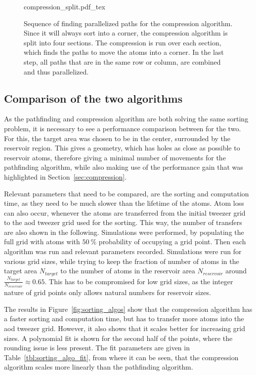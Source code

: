 \begin{figure}[ht]%
\centering
{compression_split.pdf_tex}
\caption{Sequence of finding parallelized paths for the compression algorithm. Since it will always sort into a corner, the compression algorithm is split into four sections. The compression is run over each section, which finds the paths to move the atoms into a corner. In the last step, all paths that are in the same row or column, are combined and thus parallelized.}%
\label{fig:compression_split}
\end{figure}

\subsection{Comparison of the two algorithms}

As the pathfinding and compression algorithm are both solving the same sorting problem, it is necessary to see a performance comparison between for the two. For this, the target area was chosen to be in the center, surrounded by the reservoir region. This gives a geometry, which has holes as close as possible to reservoir atoms, therefore giving a minimal number of movements for the pathfinding algorithm, while also making use of the performance gain that was highlighted in Section~\ref{sec:compression}.

Relevant parameters that need to be compared, are the sorting and computation time, as they need to be much slower than the lifetime of the atoms. Atom loss can also occur, whenever the atoms are transferred from the initial tweezer grid to the \ac{aod} tweezer grid used for the sorting. This way, the number of transfers are also shown in the following.
Simulations were performed, by populating the full grid with atoms with $\SI{50}{\percent}$ probability of occupying a grid point. Then each algorithm was run and relevant parameters recorded. Simulations were run for various grid sizes, while trying to keep the fraction of number of atoms in the target area $N_{target}$ to the number of atoms in the reservoir area $N_{reservoir}$ around $\frac{N_{target}}{N_{reservoir}} \approx 0.65$. This has to be compromised for low grid sizes, as the integer nature of grid points only allows natural numbers for reservoir sizes.

The results in Figure~\ref{fig:sorting_algos} show that the compression algorithm has a faster sorting and computation time, but has to transfer more atoms into the \ac{aod} tweezer grid. However, it also shows that it scales better for increasing grid sizes. A polynomial fit is shown for the second half of the points, where the rounding issue is less present. The fit parameters are given in Table~\ref{tbl:sorting_algo_fit}, from where it can be seen, that the compression algorithm scales more linearly than the pathfinding algorithm.

